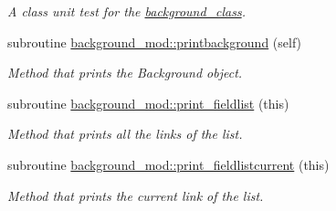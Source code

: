 \begin{DoxyCompactItemize}
\begin{DoxyCompactList}\small\item\em A class \textquotesingle{}unit\textquotesingle{} test for the \mbox{\hyperlink{structbackground__mod_1_1background__class}{background\+\_\+class}}. \end{DoxyCompactList}\item 
subroutine \mbox{\hyperlink{namespacebackground__mod_a8a8f225cffcddb742f22a402155b703f}{background\+\_\+mod\+::printbackground}} (self)
\begin{DoxyCompactList}\small\item\em Method that prints the Background object. \end{DoxyCompactList}\item 
subroutine \mbox{\hyperlink{namespacebackground__mod_acdcc52b4fb298bc145a121f9e8a4b929}{background\+\_\+mod\+::print\+\_\+fieldlist}} (this)
\begin{DoxyCompactList}\small\item\em Method that prints all the links of the list. \end{DoxyCompactList}\item 
subroutine \mbox{\hyperlink{namespacebackground__mod_a2bd18f3830c0667741efd086d36753db}{background\+\_\+mod\+::print\+\_\+fieldlistcurrent}} (this)
\begin{DoxyCompactList}\small\item\em Method that prints the current link of the list. \end{DoxyCompactList}\end{DoxyCompactItemize}
